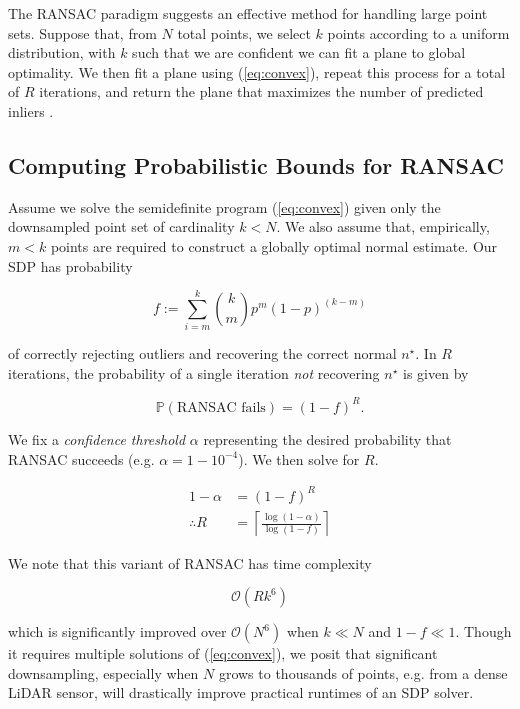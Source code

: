 \documentclass[conference]{IEEEtran}
\begin{document}
The RANSAC paradigm suggests an effective method for handling large point sets.  Suppose that, from \( N \) total points, we select \( k \) points according to a uniform distribution, with \( k \) such that we are confident we can fit a plane to global optimality.  We then fit a plane using (\ref{eq:convex}), repeat this process for a total of \( R \) iterations, and return the plane that maximizes the number of predicted inliers \cite{ransac}.

\subsection{Computing Probabilistic Bounds for RANSAC}

Assume we solve the semidefinite program (\ref{eq:convex}) given only the downsampled point set of cardinality \( k < N \).  We also assume that, empirically, \( m < k \) points are required to construct a globally optimal normal estimate.  Our SDP has probability

\begin{equation}
	f := \sum_{i = m}^k {k \choose m} p^m (1 - p)^{(k - m)}
\end{equation}

of correctly rejecting outliers and recovering the correct normal \( n^\star \).  In \( R \) iterations, the probability of a single iteration \textit{not} recovering \( n^\star \) is given by

\begin{equation}
	\mathbb{P}(\text{RANSAC fails}) = (1 - f)^R .
\end{equation}

We fix a \textit{confidence threshold} \( \alpha \) representing the desired probability that RANSAC succeeds (e.g. \( \alpha = 1 - 10^{-4} \)).  We then solve for \( R \).

\begin{align}
	1 - \alpha &= (1 - f)^R \\
	\therefore R &= \left\lceil \frac{\log(1 - \alpha)}{\log(1 - f)} \right\rceil
\end{align}

We note that this variant of RANSAC has time complexity

\begin{equation*}
	\mathcal{O}(R k^6)
\end{equation*}

which is significantly improved over \( \mathcal{O}(N^6) \) when \( k \ll N \) and \( 1 - f \ll 1 \).  Though it requires multiple solutions of (\ref{eq:convex}), we posit that significant downsampling, especially when \( N \) grows to thousands of points, e.g. from a dense LiDAR sensor, will drastically improve practical runtimes of an SDP solver.
\end{document}
